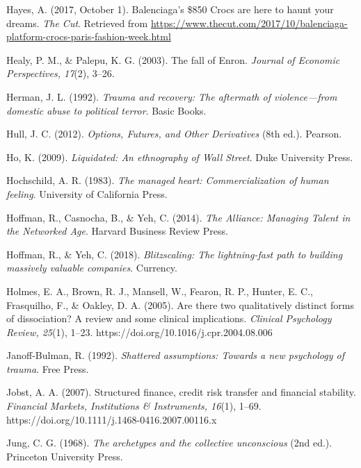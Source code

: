 \begin{thebibliography}{}
    Hayes, A. (2017, October 1). Balenciaga’s \$850 Crocs are here to haunt your dreams. \textit{The Cut}. Retrieved from \url{https://www.thecut.com/2017/10/balenciaga-platform-crocs-paris-fashion-week.html}

    Healy, P. M., \& Palepu, K. G. (2003). The fall of Enron. \textit{Journal of Economic Perspectives, 17}(2), 3–26.

    Herman, J. L. (1992). \textit{Trauma and recovery: The aftermath of violence—from domestic abuse to political terror}. Basic Books.

    Hull, J. C. (2012). \textit{Options, Futures, and Other Derivatives} (8th ed.). Pearson.

    Ho, K. (2009). \textit{Liquidated: An ethnography of Wall Street}. Duke University Press.

    Hochschild, A. R. (1983). \textit{The managed heart: Commercialization of human feeling}. University of California Press.

    Hoffman, R., Casnocha, B., \& Yeh, C. (2014). \textit{The Alliance: Managing Talent in the Networked Age}. Harvard Business Review Press.

    Hoffman, R., \& Yeh, C. (2018). \textit{Blitzscaling: The lightning-fast path to building massively valuable companies}. Currency.

    Holmes, E. A., Brown, R. J., Mansell, W., Fearon, R. P., Hunter, E. C., Frasquilho, F., \& Oakley, D. A. (2005). Are there two qualitatively distinct forms of dissociation? A review and some clinical implications. \textit{Clinical Psychology Review, 25}(1), 1–23. https://doi.org/10.1016/j.cpr.2004.08.006



    Janoff-Bulman, R. (1992). \textit{Shattered assumptions: Towards a new psychology of trauma}. Free Press.

    Jobst, A. A. (2007). Structured finance, credit risk transfer and financial stability. \textit{Financial Markets, Institutions \& Instruments, 16}(1), 1–69. https://doi.org/10.1111/j.1468-0416.2007.00116.x

    Jung, C. G. (1968). \textit{The archetypes and the collective unconscious} (2nd ed.). Princeton University Press.


\end{thebibliography}
